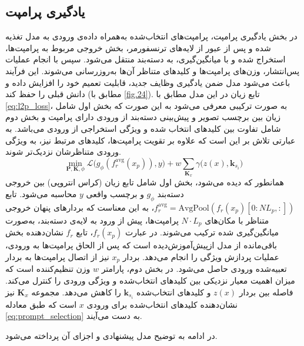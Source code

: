 \subsection{یادگیری پرامپت}
در بخش یادگیری پرامپت، پرامپت‌های انتخاب‌شده به‌همراه داده‌ی ورودی به مدل تغذیه شده و پس از عبور از لایه‌های ترنسفورمر، بخش خروجی مربوط به پرامپت‌ها، استخراج شده و با میانگین‌گیری، به دسته‌بند منتقل می‌شود. سپس با انجام عملیات پس‌انتشار، وزن‌های پرامپت‌ها و کلیدهای متناظر آن‌ها به‌روزرسانی می‌شوند. این فرآیند باعث می‌شود مدل ضمن یادگیری وظایف جدید، قابلیت تعمیم خود را افزایش داده و دانش قبلی را حفظ کند (مطابق با \cref{fig.24}). تابع زیان در این مدل مطابق با \eqref{eq:l2p_loss}، به صورت ترکیبی معرفی می‌شود به این صورت که بخش اول شامل زیان بین برچسب تصویر و پیش‌بینی دسته‌بند از ورودی دارای پرامپت و بخش دوم شامل تفاوت بین کلیدهای انتخاب شده و ویژگی استخراجی از ورودی می‌باشد. به عبارتی تلاش بر این است که علاوه بر تقویت پرامپت‌ها، کلیدهای مرتبط نیز، به ویژگی ورودی متناظرشان نزدیک‌‌‌تر شوند. 
\begin{equation}\label{eq:l2p_loss}
	\min_{\mathbf{P}, \mathbf{K}, \phi} 
	\mathcal{L}\big( g_{\phi}( f_r^{\mathrm{avg}} (x_p) ), y \big) 
	+ w \sum_{\mathbf{K}_x} \gamma \big( z(x), \mathbf{k}_{s_i} \big)
\end{equation}
همانطور که دیده می‌شود، بخش اول شامل تابع زیان (کراس انتروپی) بین خروجی دسته‌بند \(g_{\phi}\) و برچسب واقعی \(y\) محاسبه می‌شود. تابع \( f_r^{\mathrm{avg}} = \mathrm{AvgPool}(f_r(x_p)[0 : N L_p, :]) \)، به این معناست که بردارهای پنهان خروجی متناظر با مکان‌های \( N \cdot L_p \) پرامپت‌ها، پیش از ورود به لایه‌ی دسته‌بند، به‌صورت میانگین‌گیری شده ترکیب می‌شوند. 
در عبارت \( f_r(x_p) \)، تابع \( f_r \) نشان‌دهنده بخش باقی‌مانده از مدل ازپیش‌آموزش‌دیده است که پس از الحاق پرامپت‌ها به ورودی، عملیات پردازش ویژگی را انجام می‌دهد. 
بردار \( x_p \) نیز از اتصال پرامپت‌ها به بردار تعبیه‌شده ورودی حاصل می‌شود. در بخش دوم، پارامتر $w$ وزن تنظیم‌کننده است که میزان اهمیت معیار نزدیکی بین کلیدهای انتخاب‌شده و ویژگی ورودی را کنترل می‌کند. فاصله بین بردار \(z(x)\) و کلیدهای انتخاب‌شده \(\mathbf{k}_{s_i}\) را کاهش می‌دهد. مجموعه \(\mathbf{K}_x\) نیز نشان‌دهنده کلیدهای انتخاب‌شده برای ورودی \(x\) است که طبق معادله \eqref{eq:prompt_selection} به دست می‌آیند.

در ادامه به توضیح مدل پیشنهادی و اجزای آن پرداخته می‌شود. 
